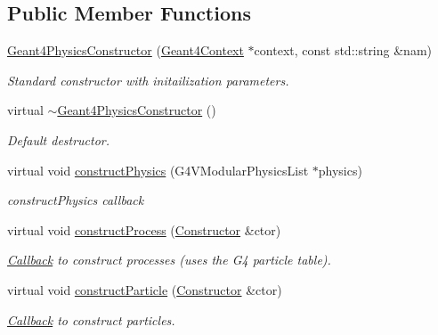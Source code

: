 \subsection*{Public Member Functions}
\begin{DoxyCompactItemize}
\item 
\hyperlink{class_d_d4hep_1_1_simulation_1_1_geant4_physics_constructor_a64ea9fcabe64e3fe28ed25cf2e707e55}{Geant4PhysicsConstructor} (\hyperlink{class_d_d4hep_1_1_simulation_1_1_geant4_context}{Geant4Context} $\ast$context, const std::string \&nam)
\begin{DoxyCompactList}\small\item\em Standard constructor with initailization parameters. \item\end{DoxyCompactList}\item 
virtual \hyperlink{class_d_d4hep_1_1_simulation_1_1_geant4_physics_constructor_af600587461631109af619f9f2b252653}{$\sim$Geant4PhysicsConstructor} ()
\begin{DoxyCompactList}\small\item\em Default destructor. \item\end{DoxyCompactList}\item 
virtual void \hyperlink{class_d_d4hep_1_1_simulation_1_1_geant4_physics_constructor_a97b80e1316943ae5805d8d006fa4f1b5}{constructPhysics} (G4VModularPhysicsList $\ast$physics)
\begin{DoxyCompactList}\small\item\em constructPhysics callback \item\end{DoxyCompactList}\item 
virtual void \hyperlink{class_d_d4hep_1_1_simulation_1_1_geant4_physics_constructor_a11d516af4f7dcfefe4fa7f154cba4386}{constructProcess} (\hyperlink{class_d_d4hep_1_1_simulation_1_1_geant4_physics_constructor_1_1_constructor}{Constructor} \&ctor)
\begin{DoxyCompactList}\small\item\em \hyperlink{class_d_d4hep_1_1_callback}{Callback} to construct processes (uses the G4 particle table). \item\end{DoxyCompactList}\item 
virtual void \hyperlink{class_d_d4hep_1_1_simulation_1_1_geant4_physics_constructor_a2568ea7c84c0514818e665c409efa304}{constructParticle} (\hyperlink{class_d_d4hep_1_1_simulation_1_1_geant4_physics_constructor_1_1_constructor}{Constructor} \&ctor)
\begin{DoxyCompactList}\small\item\em \hyperlink{class_d_d4hep_1_1_callback}{Callback} to construct particles. \item\end{DoxyCompactList}\end{DoxyCompactItemize}
